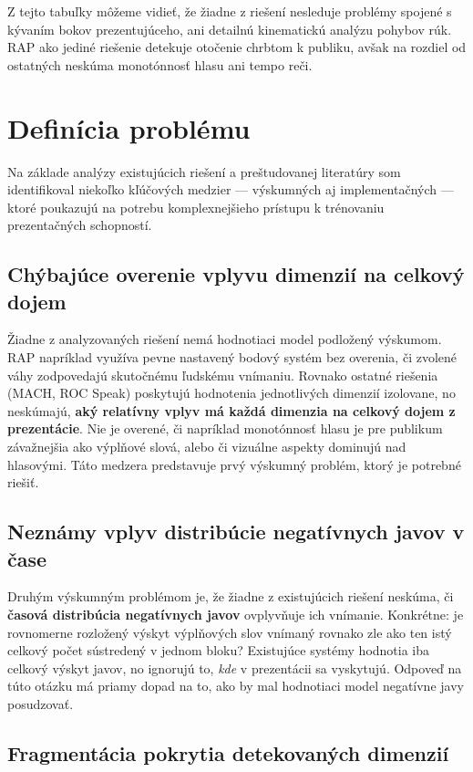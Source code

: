 Z tejto tabuľky môžeme vidieť, že žiadne z riešení nesleduje problémy spojené s kývaním bokov prezentujúceho, ani detailnú kinematickú analýzu pohybov rúk. RAP ako jediné riešenie detekuje otočenie chrbtom k publiku, avšak na rozdiel od ostatných neskúma monotónnosť hlasu ani tempo reči.

\section{Definícia problému}

Na základe analýzy existujúcich riešení a preštudovanej literatúry som identifikoval niekoľko kľúčových medzier --- výskumných aj implementačných --- ktoré poukazujú na potrebu komplexnejšieho prístupu k trénovaniu prezentačných schopností.

\subsection{Chýbajúce overenie vplyvu dimenzií na celkový dojem}

Žiadne z analyzovaných riešení nemá hodnotiaci model podložený výskumom. RAP napríklad využíva pevne nastavený bodový systém bez overenia, či zvolené váhy zodpovedajú skutočnému ľudskému vnímaniu. Rovnako ostatné riešenia (MACH, ROC Speak) poskytujú hodnotenia jednotlivých dimenzií izolovane, no neskúmajú, \textbf{aký relatívny vplyv má každá dimenzia na celkový dojem z prezentácie}. Nie je overené, či napríklad monotónnosť hlasu je pre publikum závažnejšia ako výplňové slová, alebo či vizuálne aspekty dominujú nad hlasovými. Táto medzera predstavuje prvý výskumný problém, ktorý je potrebné riešiť.

\subsection{Neznámy vplyv distribúcie negatívnych javov v čase}

Druhým výskumným problémom je, že žiadne z existujúcich riešení neskúma, či \textbf{časová distribúcia negatívnych javov} ovplyvňuje ich vnímanie. Konkrétne: je rovnomerne rozložený výskyt výplňových slov vnímaný rovnako zle ako ten istý celkový počet sústredený v jednom bloku? Existujúce systémy hodnotia iba celkový výskyt javov, no ignorujú to, \emph{kde} v prezentácii sa vyskytujú. Odpoveď na túto otázku má priamy dopad na to, ako by mal hodnotiaci model negatívne javy posudzovať.

\subsection{Fragmentácia pokrytia detekovaných dimenzií}

